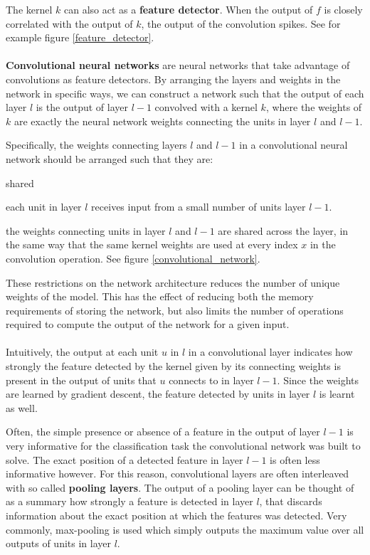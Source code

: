 The kernel $k$ can also act as a \textbf{feature detector}. When the output of $f$ is closely correlated with the output of $k$, the output of the convolution spikes. See for example figure \ref{feature_detector}.
\\\\
\textbf{Convolutional neural networks} are neural networks that take advantage of convolutions as feature detectors. By arranging the layers and weights in the network in specific ways, we can construct a network such that the output of each layer $l$ is the output of layer $l - 1$ convolved with a kernel $k$, where the weights of $k$ are exactly the neural network weights connecting the units in layer $l$ and $l - 1$.

Specifically, the weights connecting layers $l$ and $l - 1$ in a convolutional neural network should be arranged such that they are:

\begin{labeling}{shared}
	\item [\textbf{sparse}] each unit in layer $l$ receives input from a small number of units layer $l - 1$.
	\item [\textbf{shared}] the weights connecting units in layer $l$ and $l - 1$ are shared across the layer, in the same way that the same kernel weights are used at every index $x$ in the convolution operation. See figure \ref{convolutional_network}.
\end{labeling}

These restrictions on the network architecture reduces the number of unique weights of the model. This has the effect of reducing both the memory requirements of storing the network, but also limits the number of operations required to compute the output of the network for a given input.
\\\\
Intuitively, the output at each unit $u$ in $l$ in a convolutional layer indicates how strongly the feature detected by the kernel given by its connecting weights is present in the output of units that $u$ connects to in layer $l - 1$. Since the weights are learned by gradient descent, the feature detected by units in layer $l$ is learnt as well.

Often, the simple presence or absence of a feature in the output of layer $l - 1$ is very informative for the classification task the convolutional network was built to solve. The exact position of a detected feature in layer $l - 1$ is often less informative however. For this reason, convolutional layers are often interleaved with so called \textbf{pooling layers}. The output of a pooling layer can be thought of as a summary how strongly a feature is detected in layer $l$, that discards information about the exact position at which the features was detected. Very commonly, max-pooling is used which simply outputs the maximum value over all outputs of units in layer $l$.

